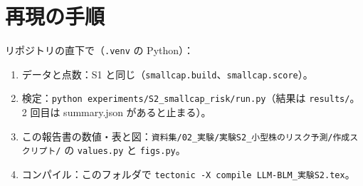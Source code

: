 \documentclass[xelatex,ja=standard,jafont=haranoaji,a4paper,10pt,openany]{bxjsreport}
\newcommand{\code}[1]{\texttt{#1}}
\begin{document}
\chapter*{再現の手順}

リポジトリの直下で（\code{.venv} の Python）：

\begin{enumerate}
\item データと点数：S1 と同じ（\code{smallcap.build}、\code{smallcap.score}）。
\item 検定：\code{python experiments/S2\_smallcap\_risk/run.py}（結果は \code{results/}。2 回目は summary.json があると止まる）。
\item この報告書の数値・表と図：\code{資料集/02\_実験/実験S2\_小型株のリスク予測/作成スクリプト/} の \code{values.py} と \code{figs.py}。
\item コンパイル：このフォルダで \code{tectonic -X compile LLM-BLM\_実験S2.tex}。
\end{enumerate}
\end{document}
